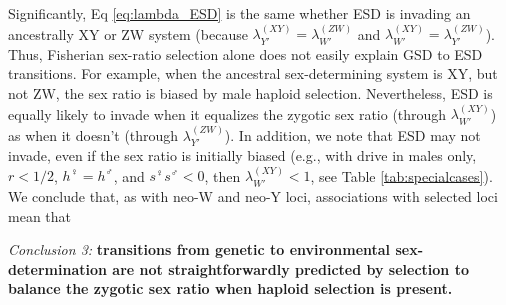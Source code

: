 \documentclass[10pt,letterpaper]{article}
\begin{document}

Significantly, Eq \eqref{eq:lambda_ESD} is the same whether ESD is invading an ancestrally XY or ZW system (because $\lambda_{Y'}^{(XY)} = \lambda_{W'}^{(ZW)}$ and $\lambda_{W'}^{(XY)} = \lambda_{Y'}^{(ZW)}$).
Thus, Fisherian sex-ratio selection alone does not easily explain GSD to ESD transitions.
For example, when the ancestral sex-determining system is XY, but not ZW, the sex ratio is biased by male haploid selection.
Nevertheless, ESD is equally likely to invade when it equalizes the zygotic sex ratio (through $\lambda_{W'}^{(XY)}$) as when it doesn't (through $\lambda_{Y'}^{(ZW)}$). 
In addition, we note that ESD may not invade, even if the sex ratio is initially biased (e.g., with drive in males only, $r<1/2$, $h^\female=h^\male$, and $s^\female s^\male<0$, then $\lambda_{W'}^{(XY)}<1$, see Table \ref{tab:specialcases}). 
We conclude that, as with neo-W and neo-Y loci, associations with selected loci mean that
\vspace{0.5cm}

\noindent\textit{Conclusion 3:}
\textbf{
transitions from genetic to environmental sex-determination are not straightforwardly predicted by selection to balance the zygotic sex ratio when haploid selection is present. 
}

\end{document}

